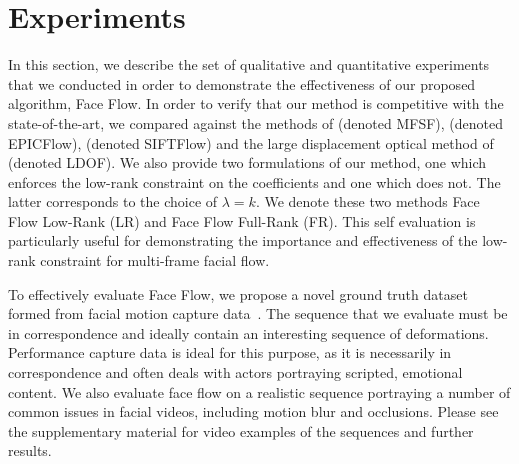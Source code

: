 \section{Experiments}\label{sec:face_flow_experiments}
In this section, we describe the set of qualitative and quantitative experiments
that we conducted in order to demonstrate the effectiveness of our proposed algorithm,
Face Flow. In order to verify that our method is competitive with the state-of-the-art,
we compared against the methods of
\citet{garg2013variational} (denoted MFSF),
\citet{revaud2015epicflow} (denoted EPICFlow),
\citet{liu2011sift} (denoted SIFTFlow) and the large displacement
optical method of \citet{brox2011large} (denoted LDOF). We also provide two
formulations of our method, one which enforces the low-rank constraint on the coefficients
and one which does not. The latter corresponds to the choice of $\lambda=k$.
We denote these two methods Face Flow Low-Rank (LR) and Face Flow
Full-Rank (FR). This self evaluation is particularly useful for demonstrating the importance
and effectiveness of the low-rank constraint for multi-frame facial flow.

To effectively evaluate Face Flow, we propose a novel ground truth dataset formed
from facial motion capture data~\cite{zhang2004spacetime}. The sequence that we
evaluate must be in correspondence and ideally contain an interesting
sequence of deformations. Performance capture data is ideal for this purpose, as
it is necessarily in correspondence and often deals with actors portraying
scripted, emotional content. We also evaluate face flow on a realistic sequence
portraying a number of common issues in facial videos, including motion blur
and occlusions. Please see the supplementary material for
video examples of the sequences and further results.
